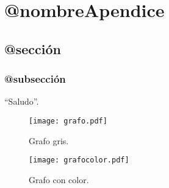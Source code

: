 \chapter{@nombreApendice}
\label{apendiceA}


\section{@sección}


\subsection{@subsección}


``Saludo''.

\begin{figure}[ht!]
\centering
\texttt{[image: grafo.pdf]}
\caption[Grafo]{Grafo gris.}
\label{imagen:grafo}
\end{figure}

\begin{figure}[ht!]
\centering
\texttt{[image: grafocolor.pdf]}
\caption[Grafo coloreado (esto sale en la tabla de contenidos)]{Grafo con color.}
\label{imagen:grafodecolores}
\end{figure}
